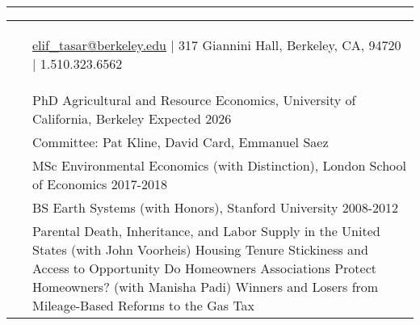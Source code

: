 \documentclass[letterpaper,10pt,oneside]{article}
\newenvironment{myresume}[2]{\pdfbookmark{#1}{#1}{\LARGE{\textbf{#1}}}\vspace{1mm}\hrule\vspace{-2mm}\begin{longtable}{p{0.12\textwidth} p{0.8\textwidth}}&#2}{\end{longtable}}
\renewcommand{\section}[2]{\vspace{-1.5em}\\\pdfbookmark{#1}{#2}{\singlespace\textsc{#1}}&}
\newcommand{\firstentry}[1]{\vspace{0em}\newline#1\vspace{0em}}
\newcommand{\entry}[1]{\vspace{-1em}\\~&#1}
\begin{document}

\begin{myresume}{}
\smallskip
\begin{center}
    \vspace{-2em}\hspace{-7em} \href{mailto: elif_tasar@berkeley.edu}{elif\_tasar@berkeley.edu} $\vert$ 317 Giannini Hall, Berkeley, CA, 94720 $\vert$ 1.510.323.6562 \vspace{-2em}
\end{center}

\bigskip
\bigskip


\section{Education}{education}

\firstentry{
PhD Agricultural and Resource Economics, University of California, Berkeley \hfill Expected 2026
}

\entry{Committee: Pat Kline, David Card, Emmanuel Saez}

\entry{MSc Environmental Economics (with Distinction), London School of Economics \hfill 2017-2018
}

\entry{
BS Earth Systems (with Honors), Stanford University \hfill 2008-2012
}


\section{Working \newline Papers}{wps}
\firstentry{[1] Parental Death, Inheritance, and Labor Supply in the United States (with John Voorheis)
\newline [2] Housing Tenure Stickiness and Access to Opportunity
\newline [3] Do Homeowners Associations Protect Homeowners? (with Manisha Padi)
\newline [4] Winners and Losers from Mileage-Based Reforms to the Gas Tax
}

\vspace{1.5em}



\end{myresume}
\end{document}
